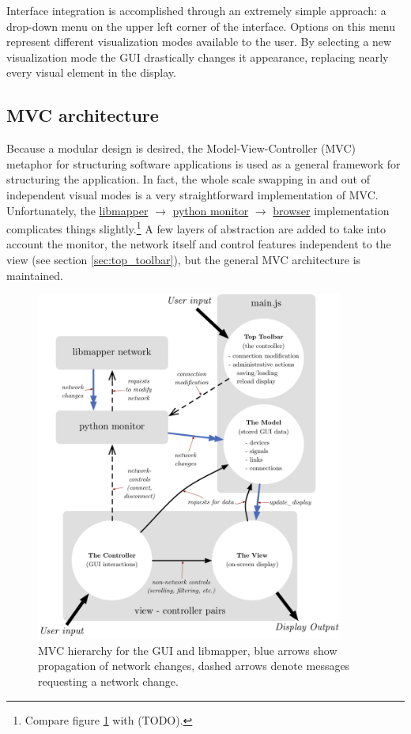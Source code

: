 Interface integration is accomplished through an extremely simple approach: a drop-down menu on the upper left corner of the interface. Options on this menu represent different visualization modes available to the user. By selecting a new visualization mode the GUI drastically changes it appearance, replacing nearly every visual element in the display.

	\subsection{MVC architecture} %
	\label{sec:mvc_architecture}

Because a modular design is desired, the Model-View-Controller (MVC) metaphor for structuring software applications \cite{MVC_krasnerpope} is used as a general framework for structuring the application. In fact, the whole scale swapping in and out of independent visual modes is a very straightforward implementation of MVC. Unfortunately, the \url{libmapper} $\rightarrow$ \url{python monitor} $\rightarrow$ \url{browser} implementation complicates things slightly.\footnote{Compare figure \ref{fig:mapper_network} with (TODO).} A few layers of abstraction are added to take into account the monitor, the network itself and control features independent to the view (see section \ref{sec:top_toolbar}), but the general MVC architecture is maintained.

\begin{figure}[!ht]
\centering
	\includegraphics[width=0.9\textwidth]{figures/mapper_network2}
\caption{MVC hierarchy for the GUI and libmapper, blue arrows show propagation of network changes, dashed arrows denote messages requesting a network change.}
\label{fig:mapper_network}
\end{figure}


